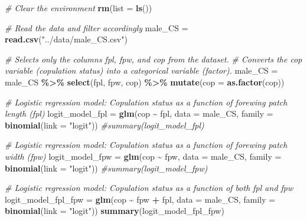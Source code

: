 \documentclass[
]{article}
\newenvironment{Shaded}{\begin{snugshade}}{\end{snugshade}}
\newcommand{\AttributeTok}[1]{\textcolor[rgb]{0.13,0.29,0.53}{#1}}
\newcommand{\CommentTok}[1]{\textcolor[rgb]{0.56,0.35,0.01}{\textit{#1}}}
\newcommand{\FunctionTok}[1]{\textcolor[rgb]{0.13,0.29,0.53}{\textbf{#1}}}
\newcommand{\NormalTok}[1]{#1}
\newcommand{\OtherTok}[1]{\textcolor[rgb]{0.56,0.35,0.01}{#1}}
\newcommand{\SpecialCharTok}[1]{\textcolor[rgb]{0.81,0.36,0.00}{\textbf{#1}}}
\newcommand{\StringTok}[1]{\textcolor[rgb]{0.31,0.60,0.02}{#1}}
\begin{document}
\begin{Shaded}
\begin{Highlighting}[]
\CommentTok{\# Clear the environment}
\FunctionTok{rm}\NormalTok{(}\AttributeTok{list =} \FunctionTok{ls}\NormalTok{())}

\CommentTok{\# Read the data and filter accordingly}
\NormalTok{male\_CS }\OtherTok{=} \FunctionTok{read.csv}\NormalTok{(}\StringTok{"../data/male\_CS.csv"}\NormalTok{)}

\CommentTok{\# Selects only the columns fpl, fpw, and cop from the dataset.}
\CommentTok{\# Converts the \textasciigrave{}cop\textasciigrave{} variable (copulation status) into a categorical variable (factor).}
\NormalTok{male\_CS }\OtherTok{=}\NormalTok{ male\_CS }\SpecialCharTok{\%\textgreater{}\%} 
  \FunctionTok{select}\NormalTok{(fpl, fpw, cop) }\SpecialCharTok{\%\textgreater{}\%} 
  \FunctionTok{mutate}\NormalTok{(}\AttributeTok{cop =} \FunctionTok{as.factor}\NormalTok{(cop))}


\CommentTok{\# Logistic regression model: Copulation status as a function of forewing patch length (fpl)}
\NormalTok{logit\_model\_fpl }\OtherTok{=} \FunctionTok{glm}\NormalTok{(cop }\SpecialCharTok{\textasciitilde{}}\NormalTok{ fpl, }\AttributeTok{data =}\NormalTok{ male\_CS, }\AttributeTok{family =} \FunctionTok{binomial}\NormalTok{(}\AttributeTok{link =} \StringTok{"logit"}\NormalTok{))}
\CommentTok{\#summary(logit\_model\_fpl)}


\CommentTok{\# Logistic regression model: Copulation status as a function of forewing patch width (fpw)}
\NormalTok{logit\_model\_fpw }\OtherTok{=} \FunctionTok{glm}\NormalTok{(cop }\SpecialCharTok{\textasciitilde{}}\NormalTok{ fpw, }\AttributeTok{data =}\NormalTok{ male\_CS, }\AttributeTok{family =} \FunctionTok{binomial}\NormalTok{(}\AttributeTok{link =} \StringTok{"logit"}\NormalTok{))}
\CommentTok{\#summary(logit\_model\_fpw)}

\CommentTok{\# Logistic regression model: Copulation status as a function of both fpl and fpw}
\NormalTok{logit\_model\_fpl\_fpw }\OtherTok{=} \FunctionTok{glm}\NormalTok{(cop }\SpecialCharTok{\textasciitilde{}}\NormalTok{ fpw }\SpecialCharTok{+}\NormalTok{ fpl, }\AttributeTok{data =}\NormalTok{ male\_CS, }\AttributeTok{family =} \FunctionTok{binomial}\NormalTok{(}\AttributeTok{link =} \StringTok{"logit"}\NormalTok{))}
\FunctionTok{summary}\NormalTok{(logit\_model\_fpl\_fpw)}
\end{Highlighting}
\end{Shaded}
\end{document}
